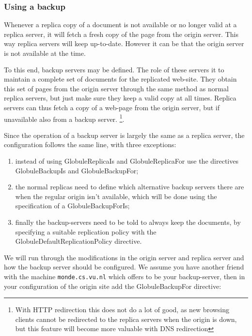 \documentclass[10pt,a4paper]{article}
\makeatletter
\newenvironment{p}{\@open{P}{}}{\@close{P}}
\newenvironment{p}{}{\par}
\makeatother
\begin{document}
\subsubsection{Using a backup}

\begin{p}
Whenever a replica copy of a document is not available or no longer valid at a
replica server, it will fetch a fresh copy of the page from the origin server.
This way replica servers will keep up-to-date.  However it can be that the
origin server is not available at the time.
\end{p}

\begin{p}
To this end, backup servers may be defined.  The role of these servers it to
maintain a complete set of documents for the replicated web-site.  They obtain
this set of pages from the origin server through the same method as normal
replica servers, but just make sure they keep a valid copy at all times.
Replica servers can thus fetch a copy of a web-page from the origin server,
but if unavailable also from a backup server.
\footnote{With HTTP redirection
this does not do a lot of good, as new browsing clients cannot be redirected
to the replica servers when the origin is down, but this feature will become
more valuable with DNS redirection}.
\end{p}

\begin{p}
Since the operation of a backup server is largely the same as a replica
server, the configuration follows the same line, with three exceptions:
\begin{enumerate}
\item instead of using GlobuleReplicaIs and GlobuleReplicaFor use the
directives GlobuleBackupIs and GlobuleBackupFor;
\item the normal replicas need to define which alternative backup servers
there are when the regular origin isn't available, which will be done using
the specification of a GlobuleBackupForIs;
\item finally the backup-servers need to be told to always keep the documents,
by specifying a suitable replication policy with the
GlobuleDefaultReplicationPolicy directive.
\end{enumerate}
\end{p}

\begin{p}
We will run through the modifications in the origin server and replica server
and how the backup server should be configured.  We assume you have another
friend with the machine \texttt{monde.cs.vu.nl} which offers to be your
backup-server, then in your configuration of the origin site add the
GlobuleBackupFor directive:
\end{p}
\end{document}

